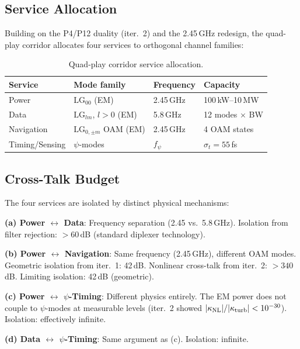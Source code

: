 \documentclass[aps,prd,twocolumn,superscriptaddress]{revtex4-2}
\newcommand{\LG}{\mathrm{LG}}
\begin{document}
\subsection{Service Allocation}

Building on the P4/P12 duality (iter.~2) and the 2.45\,GHz redesign,
the quad-play corridor allocates four services to orthogonal channel
families:

\begin{table}[h]
\caption{Quad-play corridor service allocation.}
\label{tab:quad-play}
\begin{ruledtabular}
\begin{tabular}{llll}
Service & Mode family & Frequency & Capacity \\
\hline
Power & $\LG_{00}$ (EM) & 2.45\,GHz & 100\,kW--10\,MW \\
Data & $\LG_{lm}$, $l>0$ (EM) & 5.8\,GHz & 12 modes $\times$ BW \\
Navigation & $\LG_{0,\pm m}$ OAM (EM) & 2.45\,GHz & 4 OAM states \\
Timing/Sensing & $\psi$-modes & $f_\psi$ & $\sigma_t = 55$\,fs \\
\end{tabular}
\end{ruledtabular}
\end{table}

\subsection{Cross-Talk Budget}

The four services are isolated by distinct physical mechanisms:

\textbf{(a) Power $\leftrightarrow$ Data}: Frequency separation
(2.45 vs.\ 5.8\,GHz). Isolation from filter rejection: $>60$\,dB
(standard diplexer technology).

\textbf{(b) Power $\leftrightarrow$ Navigation}: Same frequency
(2.45\,GHz), different OAM modes. Geometric isolation from iter.~1:
42\,dB. Nonlinear cross-talk from iter.~2: $>340$\,dB. Limiting
isolation: 42\,dB (geometric).

\textbf{(c) Power $\leftrightarrow$ $\psi$-Timing}: Different physics
entirely. The EM power does not couple to $\psi$-modes at measurable
levels (iter.~2 showed $|\kappa_{\rm NL}|/|\kappa_{\rm turb}| < 10^{-30}$).
Isolation: effectively infinite.

\textbf{(d) Data $\leftrightarrow$ $\psi$-Timing}: Same argument as (c).
Isolation: infinite.
\end{document}
